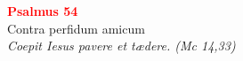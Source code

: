 


\def\greinitialformat#1{%
{\fontsize{39}{39}\selectfont #1}%
}




\vspace{0.3cm}
\begin{center}
 \textcolor{red}{\large \bf Psalmus 54}\\
Contra perfidum amicum\\
\textit{\small Coepit Iesus pavere et tædere. (Mc 14,33)}
\end{center}
